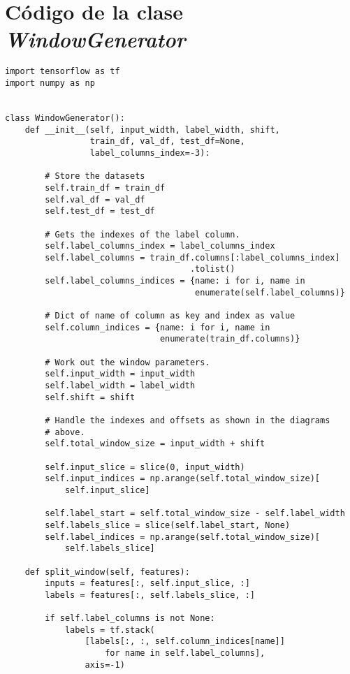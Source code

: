 \section{Código de la clase \textit{WindowGenerator}}\label{app:window_generator}

\begin{verbatim}
import tensorflow as tf
import numpy as np


class WindowGenerator():
    def __init__(self, input_width, label_width, shift,
                 train_df, val_df, test_df=None,
                 label_columns_index=-3):

        # Store the datasets
        self.train_df = train_df
        self.val_df = val_df
        self.test_df = test_df

        # Gets the indexes of the label column.
        self.label_columns_index = label_columns_index
        self.label_columns = train_df.columns[:label_columns_index]
                                     .tolist()
        self.label_columns_indices = {name: i for i, name in
                                      enumerate(self.label_columns)}
    
        # Dict of name of column as key and index as value
        self.column_indices = {name: i for i, name in
                               enumerate(train_df.columns)}

        # Work out the window parameters.
        self.input_width = input_width
        self.label_width = label_width
        self.shift = shift
        
        # Handle the indexes and offsets as shown in the diagrams
        # above.
        self.total_window_size = input_width + shift

        self.input_slice = slice(0, input_width)
        self.input_indices = np.arange(self.total_window_size)[
            self.input_slice]

        self.label_start = self.total_window_size - self.label_width
        self.labels_slice = slice(self.label_start, None)
        self.label_indices = np.arange(self.total_window_size)[
            self.labels_slice]
            
    def split_window(self, features):
        inputs = features[:, self.input_slice, :]
        labels = features[:, self.labels_slice, :]
    
        if self.label_columns is not None:
            labels = tf.stack(
                [labels[:, :, self.column_indices[name]]
                    for name in self.label_columns],
                axis=-1)
    

\end{verbatim}
